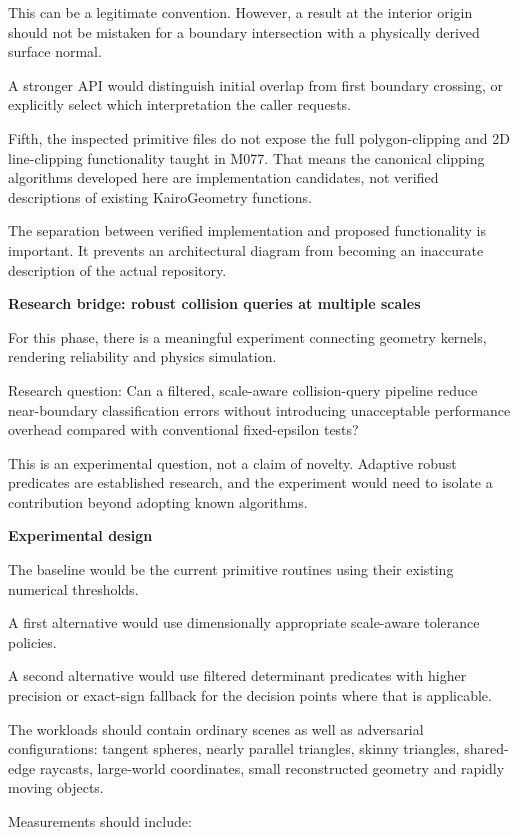 This can be a legitimate convention. However, a result at the interior origin should not be mistaken for a boundary intersection with a physically derived surface normal.

A stronger API would distinguish initial overlap from first boundary crossing, or explicitly select which interpretation the caller requests.

Fifth, the inspected primitive files do not expose the full polygon-clipping and 2D line-clipping functionality taught in M077. That means the canonical clipping algorithms developed here are implementation candidates, not verified descriptions of existing KairoGeometry functions.

The separation between verified implementation and proposed functionality is important. It prevents an architectural diagram from becoming an inaccurate description of the actual repository.

\textbf{Research bridge: robust collision queries at multiple scales}

For this phase, there is a meaningful experiment connecting geometry kernels, rendering reliability and physics simulation.

Research question: Can a filtered, scale-aware collision-query pipeline reduce near-boundary classification errors without introducing unacceptable performance overhead compared with conventional fixed-epsilon tests?

This is an experimental question, not a claim of novelty. Adaptive robust predicates are established research, and the experiment would need to isolate a contribution beyond adopting known algorithms.

\textbf{Experimental design}

The baseline would be the current primitive routines using their existing numerical thresholds.

A first alternative would use dimensionally appropriate scale-aware tolerance policies.

A second alternative would use filtered determinant predicates with higher precision or exact-sign fallback for the decision points where that is applicable.

The workloads should contain ordinary scenes as well as adversarial configurations: tangent spheres, nearly parallel triangles, skinny triangles, shared-edge raycasts, large-world coordinates, small reconstructed geometry and rapidly moving objects.

Measurements should include:

